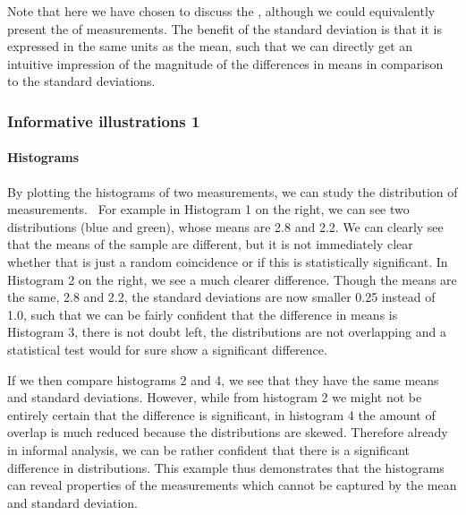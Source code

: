 \documentclass[letterpaper,10pt,english]{jupyterBook}
\begin{document}
\sphinxAtStartPar
Note that here we have chosen to discuss the ,
although we could equivalently present the  of measurements.
The benefit of the standard deviation is that it is expressed in the
same units as the mean, such that we can directly get an intuitive
impression of the magnitude of the differences in means in comparison to
the standard deviations.


\subsubsection{Informative illustrations 1}
\label{\detokenize{Evaluation/Analysis_of_evaluation_results:informative-illustrations-1}}

\paragraph{Histograms}
\label{\detokenize{Evaluation/Analysis_of_evaluation_results:histograms}}
\sphinxAtStartPar
By plotting the histograms of two measurements, we can study the
distribution of measurements.  For example in Histogram 1 on the right,
we can see two distributions (blue and green), whose means are 2.8 and
2.2. We can clearly see that the means of the sample are different, but
it is not immediately clear whether that is just a random coincidence or
if this is statistically significant. In Histogram 2 on the right, we
see a much clearer difference. Though the means are the same, 2.8 and
2.2, the standard deviations are now smaller 0.25 instead of 1.0, such
that we can be fairly confident that the difference in means is
 Histogram 3, there is not doubt left, the distributions
are not overlapping and a statistical test would for sure show a
significant difference.

\sphinxAtStartPar
If we then compare histograms 2 and 4, we see that they have the same
means and standard deviations. However, while from histogram 2 we might
not be entirely certain that the difference is significant, in histogram
4 the amount of overlap is much reduced because the distributions are
skewed. Therefore already in informal analysis, we can be rather
confident that there is a significant difference in distributions. This
example thus demonstrates that the histograms can reveal properties of
the measurements which cannot be captured by the mean and standard
deviation.
\end{document}
